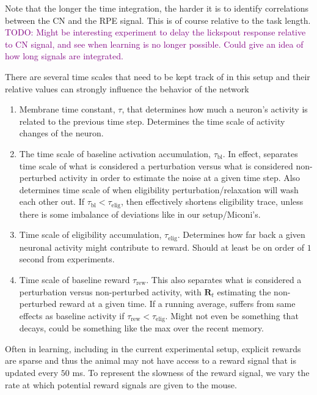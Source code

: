 \documentclass[
  journal=medium,
  manuscript=preprint,
  year=2026
]{aind-preprint}
\newcommand{\todo}[1]{\textcolor{purple}{TODO: #1}}
\begin{document}
Note that the longer the time integration, the harder it is to identify correlations between the CN and the RPE signal.
This is of course relative to the task length.
\todo{Might be interesting experiment to delay the lickspout response relative to CN signal, and see when learning is no longer possible. 
Could give an idea of how long signals are integrated.}

There are several time scales that need to be kept track of in this setup and their relative values can strongly influence the behavior of the network
\begin{enumerate}
    \item Membrane time constant, $\tau$, that determines how much a neuron's activity is related to the previous time step. 
    Determines the time scale of activity changes of the neuron.
    \item The time scale of baseline activation accumulation, $\tau_\text{bl}$.
    In effect, separates time scale of what is considered a perturbation versus what is considered non-perturbed activity in order to estimate the noise at a given time step.
    Also determines time scale of when eligibility perturbation/relaxation will wash each other out.
    If $\tau_\text{bl} < \tau_\text{elig}$, then effectively shortens eligibility trace, unless there is some imbalance of deviations like in our setup/Miconi's. 
    \item Time scale of eligibility accumulation, $\tau_\text{elig}$. 
    Determines how far back a given neuronal activity might contribute to reward.
    Should at least be on order of $1$ second from experiments.
    \item Time scale of baseline reward $\tau_\text{rew}$. 
    This also separates what is considered a perturbation versus non-perturbed activity, with $\mathbf{R}_t$ estimating the non-perturbed reward at a given time.
    If a running average, suffers from same effects as baseline activity if $\tau_\text{rew} < \tau_\text{elig}$. 
    Might not even be something that decays, could be something like the max over the recent memory.
\end{enumerate}

Often in learning, including in the current experimental setup, explicit rewards are sparse and thus the animal may not have access to a reward signal that is updated every $50$ ms.
To represent the slowness of the reward signal, we vary the rate at which potential reward signals are given to the mouse. 
\end{document}
